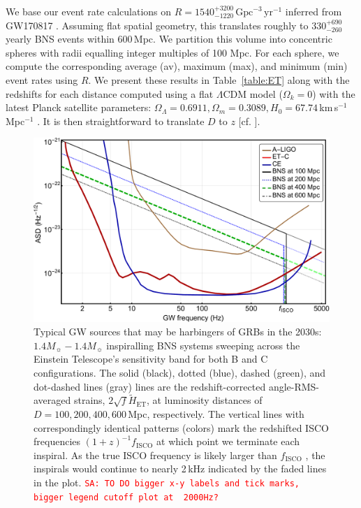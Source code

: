 \documentclass{aa}
\newcommand{\sa}[1]{{\textcolor{red}{\texttt{SA: #1}} }}
\begin{document}
We base our event rate calculations on $R=1540^{+3200}_{-1220}\,\text{Gpc}^{-3}\,\text{yr}^{-1}$ inferred from GW170817 \citep{GW170817}. Assuming flat spatial geometry, this translates roughly to $330^{+690}_{-260}$ yearly BNS events within 600\,Mpc. We partition this volume into concentric spheres with radii equalling integer multiples of 100 Mpc. For each sphere, we compute the corresponding average (av), maximum (max), and minimum (min) event rates using $R$. We present these results in Table~\ref{table:ET} along with the redshifts for
each distance computed using a flat $\Lambda$CDM model ($\Omega_k=0$) with the latest Planck satellite parameters: 
$\Omega_\Lambda = 0.6911, \Omega_m = 0.3089, H_0 = 67.74\,$km\,s$^{-1}\,$Mpc$^{-1}$ \citep{Planck2015}. %
It is then straightforward to translate $D$ to $z$ [cf. \cite{Hogg:1999ad}].
%
%
%
%
\begin{figure}[t!]
\includegraphics[width=\linewidth]{../Figs/ET_strains_redshifted.pdf}
\caption{Typical GW sources that may be harbingers of GRBs in the 2030s: $1.4 M_\sun-1.4 M_\sun$ inspiralling BNS systems sweeping across 
the Einstein Telescope's sensitivity band for both B and C configurations.
The solid (black), dotted (blue), dashed (green), and dot-dashed lines (gray) lines are the redshift-corrected
angle-RMS-averaged strains, $2\sqrt{f}\tilde{H}_\text{ET}$, at luminosity distances of $D=100, 200, 400, 600\,$Mpc, respectively. 
The vertical lines with correspondingly identical patterns (colors) mark the redshifted ISCO frequencies $(1+z)^{-1} f_\text{ISCO}$ at which point we terminate each inspiral.
As the true ISCO frequency is likely larger than $f_\text{ISCO}$ \citep{Marronetti:2003hx}, the inspirals would continue to nearly 2\,kHz indicated by the faded lines in the plot. %
\sa{TO DO  bigger x-y labels and tick marks, bigger legend cutoff plot at ~2000Hz?}
}
\label{fig:ETB2030}
\end{figure}
%
%
%
\end{document}
